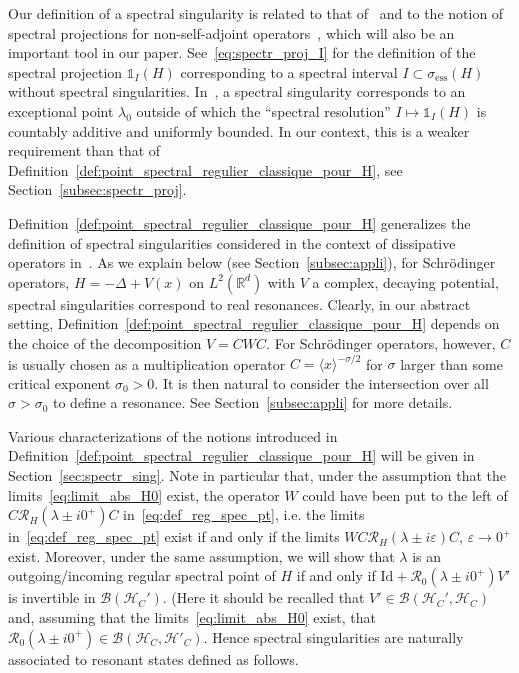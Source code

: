\documentclass[AHL,Unicode,longabstracts,published]{cedram}
\newcommand{\Hi}{\mathcal{H}}
\newcommand{\R}{\mathbb{R}}
\newcommand{\ess}{\mathrm{ess}}
\newcommand{\Res}{\mathcal{R}}
\newcommand{\clB}{\mathcal{B}}
\newcommand{\Hi}{\mathcal{H}}
\newcommand{\R}{\mathbb{R}}
\newcommand{\ess}{\mathrm{ess}}
\begin{document}
Our definition of a spectral singularity is related to that of~\cite{Sc60_01} and to the notion of spectral projections for non-self-adjoint operators~\cite{Du58_01}, which will also be an important tool in our paper. See~\eqref{eq:spectr_proj_I} for the definition of the spectral projection $\mathds{1}_I(H)$ corresponding to a spectral interval $I\subset\sigma_{\ess}(H)$ without spectral singularities. In~\cite{Sc60_01}, a spectral singularity corresponds to an exceptional point $\lambda_0$ outside of which the ``spectral resolution'' $I \mapsto \mathds{1}_I(H)$ is countably additive and uniformly bounded. In our context, this is a weaker requirement than that of Definition~\ref{def:point_spectral_regulier_classique_pour_H}, see Section~\ref{subsec:spectr_proj}.

Definition~\ref{def:point_spectral_regulier_classique_pour_H} generalizes the definition of spectral singularities considered in the context of dissipative operators in~\cite{Fa21_01,FaFr18_01,FaNi18_01}. As we explain below (see Section~\ref{subsec:appli}), for Schr\"odinger operators, $H=-\Delta+V(x)$ on $L^2(\R^d)$ with $V$ a complex, decaying potential, spectral singularities correspond to real resonances. Clearly, in our abstract setting, Definition~\ref{def:point_spectral_regulier_classique_pour_H} depends on the choice of the decomposition $V=CWC$. For Schr\"odinger operators, however, $C$ is usually chosen as a multiplication operator $C=\langle x\rangle^{-\sigma/2}$ for $\sigma$ larger than some critical exponent $\sigma_0>0$. It is then natural to consider the intersection over all $\sigma>\sigma_0$ to define a resonance. See Section~\ref{subsec:appli} for more details.

Various characterizations of the notions introduced in Definition~\ref{def:point_spectral_regulier_classique_pour_H} will be given in Section~\ref{sec:spectr_sing}. Note in particular that, under the assumption that the limits~\eqref{eq:limit_abs_H0} exist, the operator $W$ could have been put to the left of $C\Res_H(\lambda\pm i0^+)C$ in~\eqref{eq:def_reg_spec_pt}, i.e. the limits in~\eqref{eq:def_reg_spec_pt} exist if and only if the limits $WC\Res_H(\lambda\pm i\varepsilon)C$, $\varepsilon\to0^+$ exist. Moreover, under the same assumption, we will show that $\lambda$ is an outgoing/incoming regular spectral point of $H$ if and only if $\mathrm{Id}+\Res_0(\lambda\pm i0^+)V'$ is invertible in $\clB(\Hi_C')$. (Here it should be recalled that $V'\in\clB(\Hi_C',\Hi_C)$ and, assuming that the limits~\eqref{eq:limit_abs_H0} exist, that $\Res_0(\lambda\pm i0^+)\in\clB(\Hi_C,\Hi'_C)$. Hence spectral singularities are naturally associated to resonant states defined as follows.
\end{document}
